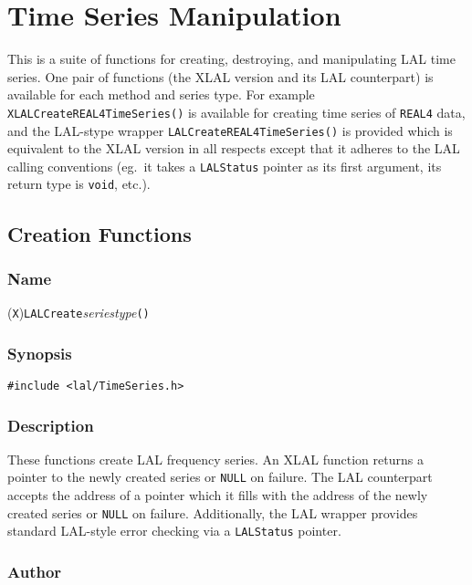 \clearpage
\section{Time Series Manipulation}
\label{s:TimeSeriesManipulation}

This is a suite of functions for creating, destroying, and manipulating LAL
time series.  One pair of functions (the XLAL version and its LAL
counterpart) is available for each method and series type.  For example
\texttt{XLALCreateREAL4TimeSeries()} is available for creating time series
of \texttt{REAL4} data, and the LAL-stype wrapper
\texttt{LALCreateREAL4TimeSeries()} is provided which is equivalent to the
XLAL version in all respects except that it adheres to the LAL calling
conventions (eg.\ it takes a \texttt{LALStatus} pointer as its first
argument, its return type is \texttt{void}, etc.).

\subsection{Creation Functions}

\subsubsection{Name}

(\texttt{X})\texttt{LALCreate}\textit{seriestype}\texttt{()}

\subsubsection{Synopsis}

\begin{verbatim}
#include <lal/TimeSeries.h>
\end{verbatim}


\subsubsection{Description}

These functions create LAL frequency series.  An XLAL function returns a
pointer to the newly created series or \texttt{NULL} on failure.  The LAL
counterpart accepts the address of a pointer which it fills with the
address of the newly created series or \texttt{NULL} on failure.
Additionally, the LAL wrapper provides standard LAL-style error checking
via a \texttt{LALStatus} pointer.

\subsubsection{Author}

